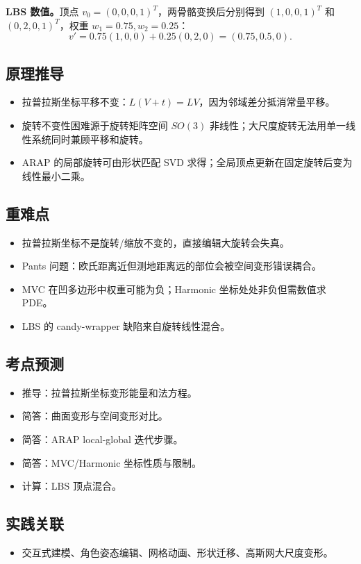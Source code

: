 \documentclass[UTF8,zihao=-4,scheme=chinese,fontset=fandol]{ctexart}
\begin{document}
\textbf{LBS 数值。}顶点 $v_0=(0,0,0,1)^T$，两骨骼变换后分别得到 $(1,0,0,1)^T$ 和 $(0,2,0,1)^T$，权重 $w_1=0.75,w_2=0.25$：
\[
v'=0.75(1,0,0)+0.25(0,2,0)=(0.75,0.5,0).
\]

\subsection{原理推导}
\begin{itemize}
  \item 拉普拉斯坐标平移不变：$L(V+t)=LV$，因为邻域差分抵消常量平移。
  \item 旋转不变性困难源于旋转矩阵空间 $SO(3)$ 非线性；大尺度旋转无法用单一线性系统同时兼顾平移和旋转。
  \item ARAP 的局部旋转可由形状匹配 SVD 求得；全局顶点更新在固定旋转后变为线性最小二乘。
\end{itemize}

\subsection{重难点}
\begin{itemize}
  \item 拉普拉斯坐标不是旋转/缩放不变的，直接编辑大旋转会失真。
  \item Pants 问题：欧氏距离近但测地距离远的部位会被空间变形错误耦合。
  \item MVC 在凹多边形中权重可能为负；Harmonic 坐标处处非负但需数值求 PDE。
  \item LBS 的 candy-wrapper 缺陷来自旋转线性混合。
\end{itemize}

\subsection{考点预测}
\begin{itemize}
  \item 推导：拉普拉斯坐标变形能量和法方程。
  \item 简答：曲面变形与空间变形对比。
  \item 简答：ARAP local-global 迭代步骤。
  \item 简答：MVC/Harmonic 坐标性质与限制。
  \item 计算：LBS 顶点混合。
\end{itemize}

\subsection{实践关联}
\begin{itemize}
  \item 交互式建模、角色姿态编辑、网格动画、形状迁移、高斯网大尺度变形。
\end{itemize}
\end{document}
